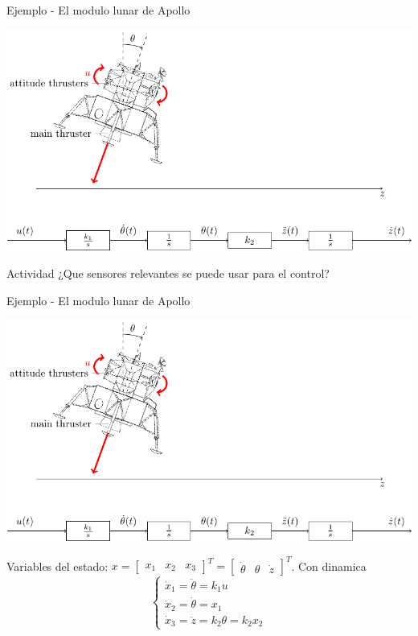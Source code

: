 \documentclass[presentation,aspectratio=1610]{beamer}
\begin{document}
\begin{frame}[label={sec:orgdca7e5d}]{Ejemplo - El modulo lunar de Apollo}
\begin{center}
\includegraphics[width=0.8\linewidth]{fig-apollo}
\end{center}
\alert{Actividad} ¿Que sensores relevantes se puede usar para el control?
\end{frame}

\begin{frame}[label={sec:orgd1eec8a}]{Ejemplo - El modulo lunar de Apollo}
\begin{center}
\includegraphics[width=0.7\linewidth]{fig-apollo}
\end{center}

Variables del estado: \(x = \begin{bmatrix} x_1 & x_2 & x_3 \end{bmatrix}^T = \begin{bmatrix} \dot{\theta} & \theta & \dot{z} \end{bmatrix}^T\). Con dinamica
\[ \begin{cases} \dot{x}_1 =  \ddot{\theta} = k_1 u\\ \dot{x}_2 = \dot{\theta} = x_1\\ \dot{x}_3 = \ddot{z} = k_2\theta = k_2x_2 \end{cases} \]
\end{frame}
\end{document}
